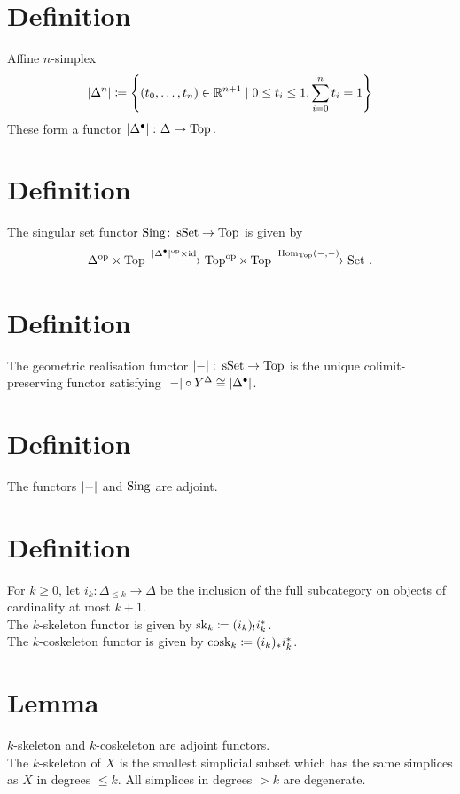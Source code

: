     \section{Definition}
        Affine $n$-simplex
        \begin{equation*}
            \left| \Delta^n \right| \coloneq \left\{ (t_0,\ldots,t_n) \in \mathbb{R}^{n+1} \mid 0 \leq t_i \leq 1, \sum^n_{i=0}t_i = 1 \right\}
        \end{equation*}
            These form a functor $\left| \Delta^{\bullet} \right| \colon \Delta \to \operatorname{Top}.$
    \section{Definition}
        The singular set functor $\operatorname{Sing} \colon \operatorname{sSet} \to \operatorname{Top}$ is given by
        \begin{equation*}
            \Delta^{\operatorname{op}} \times \operatorname{Top} \xrightarrow{\left| \Delta^{\bullet} \right|^{\operatorname{op}} \times \operatorname{id}} \operatorname{Top}^{\operatorname{op}} \times \operatorname{Top} \xrightarrow{\operatorname{Hom}_{\operatorname{Top}}(-,-)} \operatorname{Set} \,.
        \end{equation*}
    \section{Definition}
        The geometric realisation functor $\left| - \right| \colon \operatorname{sSet} \to \operatorname{Top}$ is the unique colimit-preserving functor satisfying $\left| - \right| \circ Y^{\Delta} \cong \left| \Delta^{\bullet} \right|$.
    \section{Definition}\label{chII-12}
        The functors $\left| - \right|$ and $\operatorname{Sing}$ are adjoint.
    \section{Definition}
        For $k \geq 0$, let $i_k \colon \Delta_{\leq k} \to \Delta$ be the inclusion of the full subcategory on objects of cardinality at most $k + 1$.\\
        The $k$-skeleton functor is given by $\operatorname{sk}_k \coloneq (i_k)_! i^*_k$.\\
        The $k$-coskeleton functor is given by $\operatorname{cosk}_k \coloneq (i_k)_* i^*_k$.
    \section{Lemma}
        $k$-skeleton and $k$-coskeleton are adjoint functors.\\
        The $k$-skeleton of $X$ is the smallest simplicial subset which has the same simplices as $X$ in degrees $\leq k$. All simplices in degrees $> k$ are degenerate.
